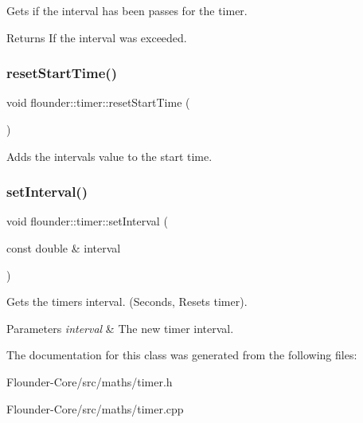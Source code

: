 Gets if the interval has been passes for the timer. 

\begin{DoxyReturn}{Returns}
If the interval was exceeded. 
\end{DoxyReturn}
\mbox{\label{classflounder_1_1timer_af71405c5ec11d085c91aa26d6a8d994c}} 
\subsubsection{\texorpdfstring{reset\+Start\+Time()}{resetStartTime()}}
{\footnotesize\ttfamily void flounder\+::timer\+::reset\+Start\+Time (\begin{DoxyParamCaption}{ }\end{DoxyParamCaption})}



Adds the intervals value to the start time. 

\mbox{\label{classflounder_1_1timer_a801b9883c757b92eaa957f3222c4791d}} 
\subsubsection{\texorpdfstring{set\+Interval()}{setInterval()}}
{\footnotesize\ttfamily void flounder\+::timer\+::set\+Interval (\begin{DoxyParamCaption}\item[{const double \&}]{interval }\end{DoxyParamCaption})}



Gets the timers interval. (Seconds, Resets timer). 


\begin{DoxyParams}{Parameters}
{\em interval} & The new timer interval. \\
\hline
\end{DoxyParams}


The documentation for this class was generated from the following files\+:\begin{DoxyCompactItemize}
\item 
Flounder-\/\+Core/src/maths/timer.\+h\item 
Flounder-\/\+Core/src/maths/timer.\+cpp\end{DoxyCompactItemize}
